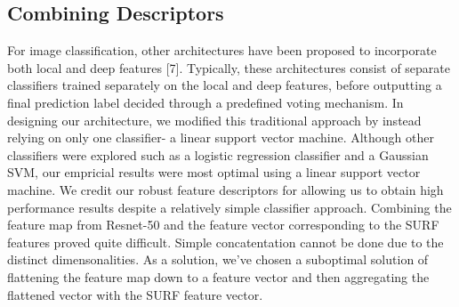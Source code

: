 \documentclass{article}
\begin{document}
\subsection{Combining  Descriptors}
\label{ssec:subhead}
\hspace{\parindent}For image classification, other architectures have been proposed to incorporate both local and deep features [7]. Typically, these architectures consist of separate classifiers trained separately on the local and deep features, before outputting a final prediction label decided through a predefined voting mechanism. In designing our architecture, we modified this traditional approach by instead relying on only one classifier- a linear support vector machine. Although other classifiers were explored such as a logistic regression classifier and a Gaussian SVM, our empricial results were most optimal using a linear support vector machine. We credit our robust feature descriptors for allowing us to obtain high performance results despite a relatively simple classifier approach.\newline
\indent Combining the feature map from Resnet-50 and the feature vector corresponding to the SURF features proved quite difficult. Simple concatentation cannot be done due to the distinct dimensonalities. As a solution, we've chosen a suboptimal solution of flattening the feature map down to a feature vector and then aggregating the flattened vector with the SURF feature vector. 
\newline
\end{document}
